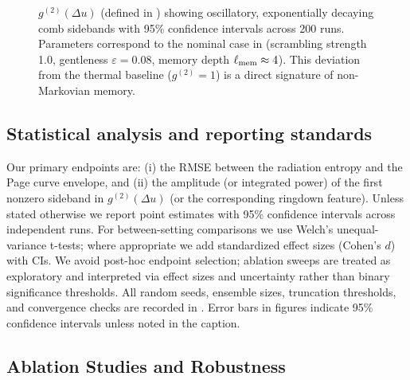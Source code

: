 \documentclass[a4paper,11pt]{article}
\theoremstyle{plain}
\theoremstyle{definition}
\theoremstyle{remark}
\begin{document}
\begin{figure}[htbp]
\centering
{}
\caption{$g^{(2)}(\Delta u)$ (defined in ) showing oscillatory, exponentially decaying comb sidebands with 95\% confidence intervals across 200 runs. Parameters correspond to the nominal case in  (scrambling strength 1.0, gentleness $\varepsilon=0.08$, memory depth $\ell_{\rm mem} \approx 4$). This deviation from the thermal baseline ($g^{(2)}=1$) is a direct signature of non-Markovian memory.}
\label{fig:g2}
\end{figure}

\subsection{Statistical analysis and reporting standards}
\label{ssec:stats}
Our primary endpoints are: (i) the RMSE between the radiation entropy and the Page curve envelope, and (ii) the amplitude (or integrated power) of the first nonzero sideband in $g^{(2)}(\Delta u)$ (or the corresponding ringdown feature). Unless stated otherwise we report point estimates with 95\% confidence intervals across independent runs. For between-setting comparisons we use Welch's unequal-variance t-tests; where appropriate we add standardized effect sizes (Cohen's $d$) with CIs. We avoid post-hoc endpoint selection; ablation sweeps are treated as exploratory and interpreted via effect sizes and uncertainty rather than binary significance thresholds. All random seeds, ensemble sizes, truncation thresholds, and convergence checks are recorded in . Error bars in figures indicate 95\% confidence intervals unless noted in the caption.

\subsection{Ablation Studies and Robustness}
\label{subsec:ablation}
\end{document}
